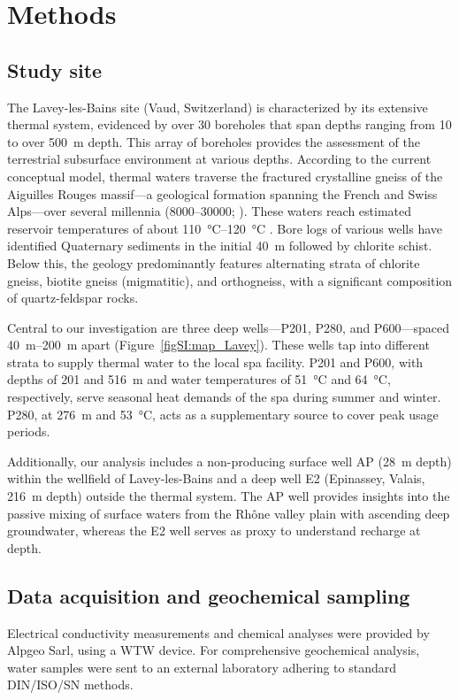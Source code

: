 \section{Methods}
\subsection{Study site}
The Lavey-les-Bains site (Vaud, Switzerland) is characterized by its extensive thermal system, evidenced by over 30 boreholes that span depths ranging from 10 to over \SI{500}{\meter} depth.
This array of boreholes provides the assessment of the terrestrial subsurface environment at various depths.
According to the current conceptual model, thermal waters traverse the fractured crystalline gneiss of the Aiguilles Rouges massif---a geological formation spanning the French and Swiss Alps---over several millennia (\SIrange{8000}{30000}{\year}; \cite{sonney2009numerical, bianchetti1994hydrogeologie}).
These waters reach estimated reservoir temperatures of about \SIrange{110}{120}{\celsius} \citep{sonney2009numerical, wanner2019quantification}.
Bore logs of various wells \citep{swisstopo2024lavey1} have identified Quaternary sediments in the initial \SI{40}{\meter} followed by chlorite schist. 
Below this, the geology predominantly features alternating strata of chlorite gneiss, biotite gneiss (migmatitic), and orthogneiss, with a significant composition of quartz-feldspar rocks.

Central to our investigation are three deep wells---P201, P280, and P600---spaced \SIrange{40}{200}{\meter} apart (Figure~\ref{figSI:map_Lavey}).
These wells tap into different strata to supply thermal water to the local spa facility.
P201 and P600, with depths of 201 and \SI{516}{\meter} and water temperatures of \SI{51}{\celsius} and \SI{64}{\celsius}, respectively, serve seasonal heat demands of the spa during summer and winter. 
P280, at \SI{276}{\meter} and \SI{53}{\celsius}, acts as a supplementary source to cover peak usage periods.

Additionally, our analysis includes a non-producing surface well AP (\SI{28}{\meter} depth) within the wellfield of Lavey-les-Bains and a deep well E2 (Epinassey, Valais, \SI{216}{\meter} depth) outside the thermal system. 
The AP well provides insights into the passive mixing of surface waters from the Rhône valley plain with ascending deep groundwater, whereas the E2 well serves as proxy to understand recharge at depth.

\subsection{Data acquisition and geochemical sampling}
Electrical conductivity measurements and chemical analyses were provided by Alpgeo Sarl, using a WTW device.
For comprehensive geochemical analysis, water samples were sent to an external laboratory adhering to standard DIN/ISO/SN methods.

